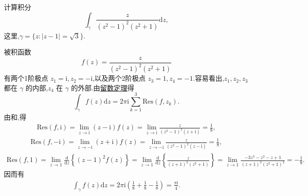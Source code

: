 \documentclass[../../main.tex]{subfiles}
\begin{document}
\begin{example}
计算积分
\[
\int_{\gamma} \frac{z}{(z^2 - 1)^2 (z^2 + 1)} \mathrm{d}z,
\]
这里,\( \gamma = \{ z: |z - 1| = \sqrt{3} \} \).
\end{example}
\begin{solution}
被积函数
\[
f(z) = \frac{z}{(z^2 - 1)^2 (z^2 + 1)}
\]
有两个1阶极点 \( z_1 = \mathrm{i}, z_2 = -\mathrm{i} \),以及两个2阶极点 \( z_3 = 1, z_4 = -1 \).容易看出,\( z_1, z_2, z_3 \) 都在 \( \gamma \) 的内部,\( z_4 \) 在 \( \gamma \) 的外部.由\hyperref[theorem:留数定理(残数定理)-定理5.4.9]{留数定理}得
\[
\int_{\gamma} f(z) \mathrm{d}z = 2\pi \mathrm{i} \sum_{k = 1}^{3} \mathrm{Res}(f, z_k).
\]
由和,得
\begin{align*}
\mathrm{Res}(f, \mathrm{i}) = \lim_{z \to \mathrm{i}} (z - \mathrm{i}) f(z) = \lim_{z \to \mathrm{i}} \frac{z}{(z^2 - 1)^2 (z + \mathrm{i})} = \frac{1}{8},
\end{align*}
\begin{align*}
\mathrm{Res}(f, -\mathrm{i}) = \lim_{z \to -\mathrm{i}} (z + \mathrm{i}) f(z) = \lim_{z \to -\mathrm{i}} \frac{z}{(z^2 - 1)^2 (z - \mathrm{i})} = \frac{1}{8},
\end{align*}
\begin{align*}
\mathrm{Res}(f, 1) = \lim_{z \to 1} \frac{\mathrm{d}}{\mathrm{d}z} \left\{ (z - 1)^2 f(z) \right\} = \lim_{z \to 1} \frac{\mathrm{d}}{\mathrm{d}z} \left\{ \frac{z}{(z + 1)^2 (z^2 + 1)} \right\} = \lim_{z \to 1} \frac{-3z^3 - z^2 - z + 1}{(z + 1)^3 (z^2 + 1)^2} = -\frac{1}{8}.
\end{align*}
因而有
\begin{align*}
\int_{\gamma} f(z) \mathrm{d}z = 2\pi \mathrm{i} \left( \frac{1}{8} + \frac{1}{8} - \frac{1}{8} \right) = \frac{\pi \mathrm{i}}{4}.
\end{align*}

\end{solution}
\end{document}

